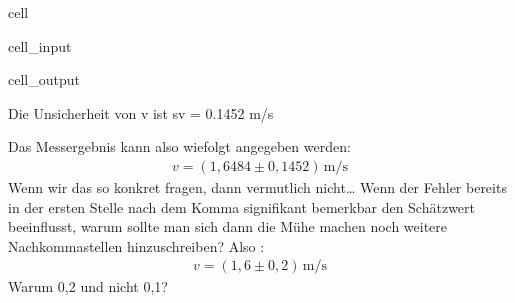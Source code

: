 \documentclass[letterpaper,10pt,english]{jupyterBook}
\begin{document}
\begin{sphinxuseclass}{cell}\begin{sphinxVerbatimInput}

\begin{sphinxuseclass}{cell_input}
\begin{sphinxVerbatim}[commandchars=\\\{\}]
    
 
\end{sphinxVerbatim}

\end{sphinxuseclass}\end{sphinxVerbatimInput}
\begin{sphinxVerbatimOutput}

\begin{sphinxuseclass}{cell_output}
\begin{sphinxVerbatim}[commandchars=\\\{\}]
Die Unsicherheit von v ist 	 s\PYGZus{}v = 0.1452 m/s
\end{sphinxVerbatim}

\end{sphinxuseclass}\end{sphinxVerbatimOutput}

\end{sphinxuseclass}
\sphinxAtStartPar
Das Messergebnis kann also wiefolgt angegeben werden:
\begin{equation*}
\begin{split}v = (1,6484 \pm 0,1452)\,\mathrm{m/s}\end{split}
\end{equation*}
\sphinxAtStartPar
{} Wenn wir das so konkret fragen, dann vermutlich nicht…
Wenn der Fehler bereits in der ersten Stelle nach dem Komma signifikant bemerkbar den Schätzwert beeinflusst, warum sollte man sich dann die Mühe machen noch weitere Nachkommastellen hinzuschreiben? Also :
\begin{equation*}
\begin{split}v = (1,6 \pm 0,2)\,\mathrm{m/s}\end{split}
\end{equation*}
\sphinxAtStartPar
Warum 0,2 und nicht 0,1? 
\end{document}
